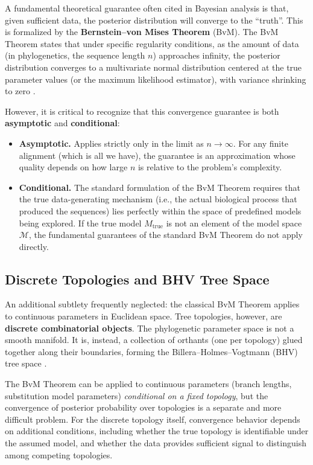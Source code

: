 A fundamental theoretical guarantee often cited in Bayesian analysis is that, given sufficient data, the posterior distribution will converge to the ``truth''. This is formalized by the \textbf{Bernstein--von Mises Theorem} (BvM). The BvM Theorem states that under specific regularity conditions, as the amount of data (in phylogenetics, the sequence length $n$) approaches infinity, the posterior distribution converges to a multivariate normal distribution centered at the true parameter values (or the maximum likelihood estimator), with variance shrinking to zero \parencite{vandervaart1998}.

However, it is critical to recognize that this convergence guarantee is both \textbf{asymptotic} and \textbf{conditional}:

\begin{itemize}
    \item \textbf{Asymptotic.} Applies strictly only in the limit as $n \to \infty$. For any finite alignment (which is all we have), the guarantee is an approximation whose quality depends on how large $n$ is relative to the problem's complexity.
    \item \textbf{Conditional.} The standard formulation of the BvM Theorem requires that the true data-generating mechanism (i.e., the actual biological process that produced the sequences) lies perfectly within the space of predefined models being explored. If the true model $M_{\text{true}}$ is not an element of the model space $\mathcal{M}$, the fundamental guarantees of the standard BvM Theorem do not apply directly.
\end{itemize}

\subsection{Discrete Topologies and BHV Tree Space}

An additional subtlety frequently neglected: the classical BvM Theorem applies to continuous parameters in Euclidean space. Tree topologies, however, are \textbf{discrete combinatorial objects}. The phylogenetic parameter space is not a smooth manifold. It is, instead, a collection of orthants (one per topology) glued together along their boundaries, forming the Billera--Holmes--Vogtmann (BHV) tree space \parencite{billera2001}.

The BvM Theorem can be applied to continuous parameters (branch lengths, substitution model parameters) \textit{conditional on a fixed topology}, but the convergence of posterior probability over topologies is a separate and more difficult problem. For the discrete topology itself, convergence behavior depends on additional conditions, including whether the true topology is identifiable under the assumed model, and whether the data provides sufficient signal to distinguish among competing topologies.

